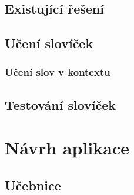 \documentclass[a4paper,11pt,titlepage,fleqn]{article}
\begin{document}
    \subsection{Existující řešení}


    \subsection{Učení slovíček}

        \subsubsection{Učení slov v kontextu}
    
    \subsection{Testování slovíček}

    

\newpage
\section{Návrh aplikace}
    
    \subsection{Učebnice}
\end{document}
